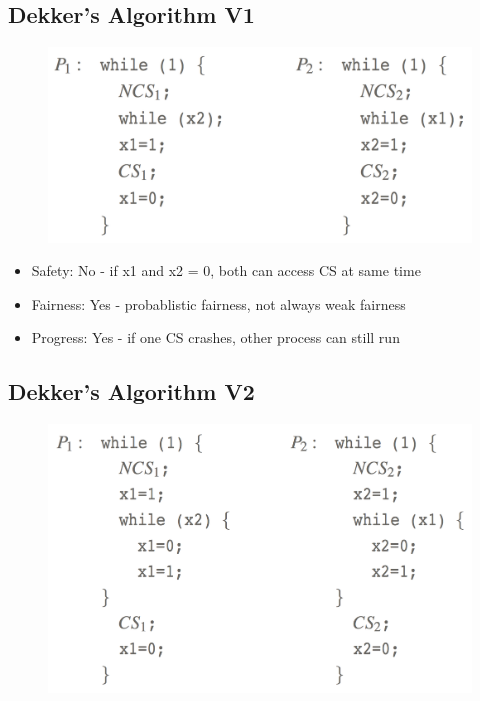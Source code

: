 \documentclass{hw}
\begin{document}
\subsection{Dekker's Algorithm V1}
\begin{figure}[H]
  \centering
  \includegraphics[scale=.4]{img/dekker1}
\end{figure}

\begin{itemize}
  \item Safety:    No - if x1 and x2 = 0, both can access CS at same time   
  \item Fairness:  Yes  - probablistic fairness, not always weak fairness 
  \item Progress:  Yes - if one CS crashes, other process can still run     
\end{itemize}

\subsection{Dekker's Algorithm V2}
\begin{figure}[H]
  \centering
  \includegraphics[scale=.4]{img/dekker2}
\end{figure}
                                                                        
\end{document}
